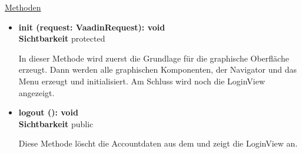 \underline{Methoden}
\begin{itemize}
\itemsep0pt
\item \textbf{init (request: VaadinRequest): void}\hfill\\
\textbf{Sichtbarkeit} protected

In dieser Methode wird zuerst die Grundlage für die graphische Oberfläche erzeugt. Dann werden alle graphischen Komponenten, der Navigator und das Menu erzeugt und initialisiert. Am Schluss wird noch die LoginView angezeigt.

\item \textbf{logout (): void}\hfill\\
\textbf{Sichtbarkeit} public

Diese Methode löscht die Accountdaten aus dem  und zeigt die LoginView an.

\end{itemize}
